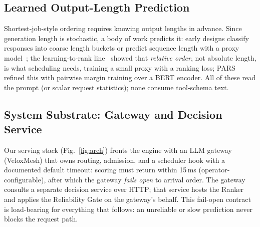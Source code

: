 \subsection{Learned Output-Length Prediction}
Shortest-job-style ordering requires knowing output lengths in
advance. Since generation length is stochastic, a body of work predicts it:
early designs classify responses into coarse length buckets or predict
sequence length with a proxy model~\cite{ssjf2024}; the
learning-to-rank line~\cite{fuLTR2024} showed that \emph{relative order},
not absolute length, is what scheduling needs, training a small proxy with a
ranking loss; PARS~\cite{tao2026ranking} refined this with pairwise margin
training over a BERT encoder. All of these read the prompt (or scalar request
statistics); none consume tool-schema text.

\subsection{System Substrate: Gateway and Decision Service}
Our serving stack (Fig.~\ref{fig:arch}) fronts the engine with an
LLM gateway (VeloxMesh) that owns routing, admission, and a scheduler hook
with a documented default timeout: scoring must return within 15\,ms
(operator-configurable), after which
the gateway \emph{fails open} to arrival order. The gateway consults a
separate decision service over HTTP; that service
hosts the Ranker and applies the Reliability Gate on the gateway's behalf.
This fail-open contract is load-bearing for everything that follows: an
unreliable or slow prediction never blocks the request path.

